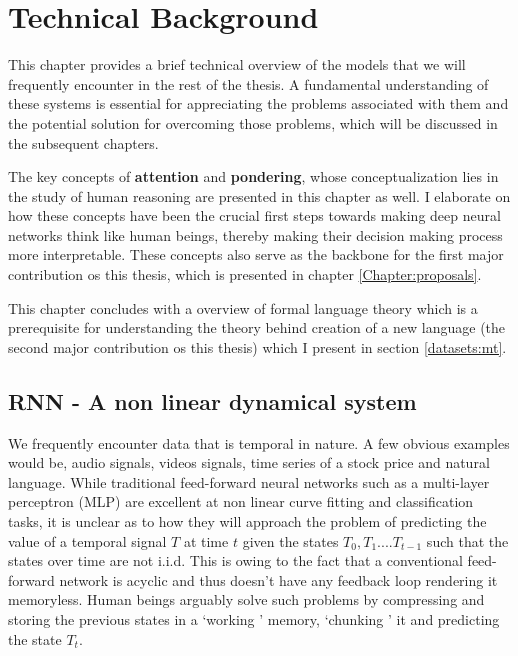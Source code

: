 \chapter{Technical Background}
This chapter provides a brief technical overview of the models that we will frequently encounter in the rest of the thesis. A fundamental understanding of these systems is essential for appreciating the problems associated with them and the potential solution for overcoming those problems, which will be discussed in the subsequent chapters. 

The key concepts of \textbf{attention} and \textbf{pondering}, whose conceptualization lies in the study of human reasoning are presented in this chapter as well. I elaborate on how these concepts have been the crucial first steps towards making deep neural networks think like human beings, thereby making their decision making process more interpretable. These concepts also serve as the backbone for the first major contribution os this thesis, which is presented in chapter \ref{Chapter:proposals}.

This chapter concludes with a overview of formal language theory which is a prerequisite for understanding the theory behind creation of a new language (the second major contribution os this thesis) which I present in section \ref{datasets:mt}.

\section{RNN - A non linear dynamical system} \label{RNN}
We frequently encounter data that is temporal in nature. A few obvious examples would  be, audio signals, videos signals, time series of a stock price and natural language. While traditional feed-forward neural networks such as a multi-layer perceptron (MLP) \citep{rosenblatt1962} are excellent at non linear curve fitting and classification tasks, it is unclear as to how they will approach the problem of predicting the value of a temporal signal $T$ at time $t$ given the states $T_{0}, T_{1}....T_{t-1}$ such that the states over time are not i.i.d. This is owing to the fact that a conventional feed-forward network  is acyclic and thus doesn't have any feedback loop rendering it memoryless. Human beings arguably solve such problems by compressing and storing the previous states in a \lq working \rq{} memory,\citep{Miller1956} \lq chunking \rq{} it \citep{neath2013} \citep{craik2000} and predicting the state $T_t$. 

